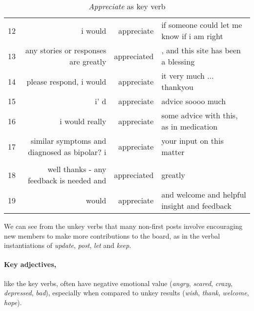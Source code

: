 \begin{table}
\begin{tabular}{lrrl}
12 &                                                                               i would     &    appreciate &   if someone could let me know if i am right                     \\
13 &                                                  any stories or responses are greatly     &   appreciated &  , and this site has been a blessing                             \\
14 &                                                              please respond, i would      &    appreciate &   it very much ... thankyou                                      \\
15 &                                                                                    i' d   &    appreciate &   advice soooo much                                              \\
16 &                                                                        i would really     &    appreciate &   some advice with this, as in medication                        \\
17 &   similar symptoms and diagnosed as bipolar? i                                            &    appreciate &   your input on this matter                                      \\                                       \\
18 &                                              well thanks - any feedback is needed and     &   appreciated &   greatly                                                        \\
19 &                                                                                 would     &    appreciate &   and welcome and helpful insight and feedback                   \\
\bottomrule
\end{tabular}
\caption{\emph{Appreciate} as key verb}
\label{tab:conc:appreciate}
\end{table}
We can see from the unkey verbs that many non-first posts involve encouraging new members to make more contributions to the board, as in the verbal instantiations of \emph{update}, \emph{post}, \emph{let} and \emph{keep}.

\paragraph{Key adjectives,} like the key verbs, often have negative emotional value (\emph{angry}, \emph{scared}, \emph{crazy}, \emph{depressed}, \emph{bad}), especially when compared to unkey results (\emph{wish}, \emph{thank}, \emph{welcome}, \emph{hope}).

